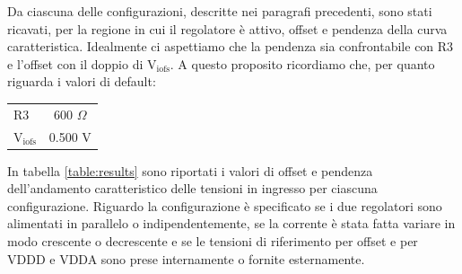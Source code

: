 Da ciascuna delle configurazioni, descritte nei paragrafi precedenti, sono stati ricavati, per la regione in cui il regolatore è attivo, offset e pendenza della curva caratteristica.
Idealmente ci aspettiamo che la pendenza sia confrontabile con R3 e l'offset con il doppio di $\mathrm{V_{iofs}}$.
A questo proposito ricordiamo che, per quanto riguarda i valori di default: 
\begin{center}
\begin{tabular}{lc}
\hline
$\mathrm{R3}$ & 600 $\Omega$ \\%
$\mathrm{V_{iofs}}$ & 0.500 V\\ 
\hline
\end{tabular}
\end{center}

In tabella \ref{table:results} sono riportati i valori di offset e pendenza dell'andamento caratteristico delle tensioni in ingresso per ciascuna configurazione.
Riguardo la configurazione è specificato se i due regolatori sono alimentati in parallelo o indipendentemente, se la corrente è stata fatta variare in modo crescente o decrescente e se le tensioni di riferimento per offset e per VDDD e VDDA sono prese internamente o fornite esternamente.

